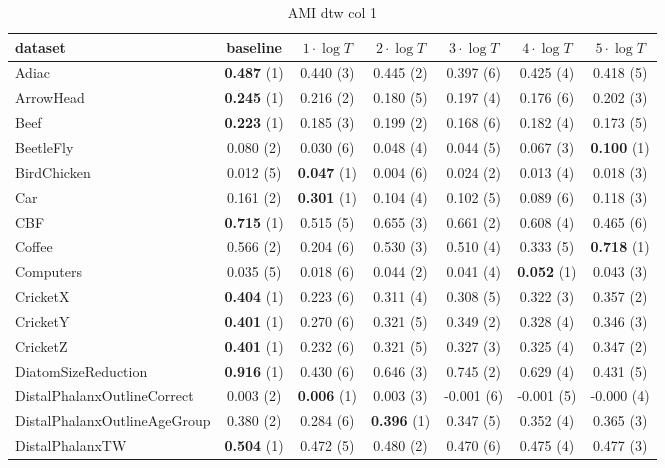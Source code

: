     \begin{table}[ht]
    \caption{AMI dtw col 1} 
    \begin{adjustbox}{width=\textwidth}
    \begin{tabular}{lcccccc}
    \hline
    dataset & baseline & \textbf{$1\cdot \log{T}$} & \textbf{$2\cdot \log{T}$} & \textbf{$3\cdot \log{T}$} & \textbf{$4\cdot \log{T}$} & \textbf{$5\cdot \log{T}$} \\ \hline
    Adiac & \textbf{0.487} (1) & 0.440 (3) & 0.445 (2) & 0.397 (6) & 0.425 (4) & 0.418 (5) \\
    ArrowHead & \textbf{0.245} (1) & 0.216 (2) & 0.180 (5) & 0.197 (4) & 0.176 (6) & 0.202 (3) \\
    Beef & \textbf{0.223} (1) & 0.185 (3) & 0.199 (2) & 0.168 (6) & 0.182 (4) & 0.173 (5) \\
    BeetleFly & 0.080 (2) & 0.030 (6) & 0.048 (4) & 0.044 (5) & 0.067 (3) & \textbf{0.100} (1) \\
    BirdChicken & 0.012 (5) & \textbf{0.047} (1) & 0.004 (6) & 0.024 (2) & 0.013 (4) & 0.018 (3) \\
    Car & 0.161 (2) & \textbf{0.301} (1) & 0.104 (4) & 0.102 (5) & 0.089 (6) & 0.118 (3) \\
    CBF & \textbf{0.715} (1) & 0.515 (5) & 0.655 (3) & 0.661 (2) & 0.608 (4) & 0.465 (6) \\
    Coffee & 0.566 (2) & 0.204 (6) & 0.530 (3) & 0.510 (4) & 0.333 (5) & \textbf{0.718} (1) \\
    Computers & 0.035 (5) & 0.018 (6) & 0.044 (2) & 0.041 (4) & \textbf{0.052} (1) & 0.043 (3) \\
    CricketX & \textbf{0.404} (1) & 0.223 (6) & 0.311 (4) & 0.308 (5) & 0.322 (3) & 0.357 (2) \\
    CricketY & \textbf{0.401} (1) & 0.270 (6) & 0.321 (5) & 0.349 (2) & 0.328 (4) & 0.346 (3) \\
    CricketZ & \textbf{0.401} (1) & 0.232 (6) & 0.321 (5) & 0.327 (3) & 0.325 (4) & 0.347 (2) \\
    DiatomSizeReduction & \textbf{0.916} (1) & 0.430 (6) & 0.646 (3) & 0.745 (2) & 0.629 (4) & 0.431 (5) \\
    DistalPhalanxOutlineCorrect & 0.003 (2) & \textbf{0.006} (1) & 0.003 (3) & -0.001 (6) & -0.001 (5) & -0.000 (4) \\
    DistalPhalanxOutlineAgeGroup & 0.380 (2) & 0.284 (6) & \textbf{0.396} (1) & 0.347 (5) & 0.352 (4) & 0.365 (3) \\
    DistalPhalanxTW & \textbf{0.504} (1) & 0.472 (5) & 0.480 (2) & 0.470 (6) & 0.475 (4) & 0.477 (3) \\

\end{tabular}
\end{adjustbox}
\end{table}
